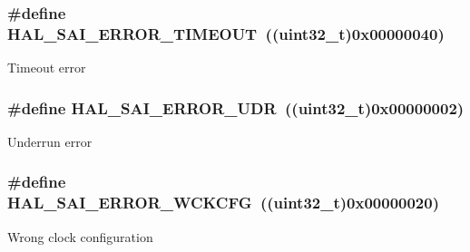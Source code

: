 \subsubsection[{\texorpdfstring{H\+A\+L\+\_\+\+S\+A\+I\+\_\+\+E\+R\+R\+O\+R\+\_\+\+T\+I\+M\+E\+O\+UT}{HAL_SAI_ERROR_TIMEOUT}}]{\setlength{\rightskip}{0pt plus 5cm}\#define H\+A\+L\+\_\+\+S\+A\+I\+\_\+\+E\+R\+R\+O\+R\+\_\+\+T\+I\+M\+E\+O\+UT~((uint32\+\_\+t)0x00000040)}\hypertarget{group___s_a_i___error___code_ga9093326866198c250fc9a40bd21811bc}{}\label{group___s_a_i___error___code_ga9093326866198c250fc9a40bd21811bc}
Timeout error 
\subsubsection[{\texorpdfstring{H\+A\+L\+\_\+\+S\+A\+I\+\_\+\+E\+R\+R\+O\+R\+\_\+\+U\+DR}{HAL_SAI_ERROR_UDR}}]{\setlength{\rightskip}{0pt plus 5cm}\#define H\+A\+L\+\_\+\+S\+A\+I\+\_\+\+E\+R\+R\+O\+R\+\_\+\+U\+DR~((uint32\+\_\+t)0x00000002)}\hypertarget{group___s_a_i___error___code_ga198e1a2760419cfd42d9c7ee04615396}{}\label{group___s_a_i___error___code_ga198e1a2760419cfd42d9c7ee04615396}
Underrun error 
\subsubsection[{\texorpdfstring{H\+A\+L\+\_\+\+S\+A\+I\+\_\+\+E\+R\+R\+O\+R\+\_\+\+W\+C\+K\+C\+FG}{HAL_SAI_ERROR_WCKCFG}}]{\setlength{\rightskip}{0pt plus 5cm}\#define H\+A\+L\+\_\+\+S\+A\+I\+\_\+\+E\+R\+R\+O\+R\+\_\+\+W\+C\+K\+C\+FG~((uint32\+\_\+t)0x00000020)}\hypertarget{group___s_a_i___error___code_gaa2a459f53c9b44c5a32a30740d4e2c09}{}\label{group___s_a_i___error___code_gaa2a459f53c9b44c5a32a30740d4e2c09}
Wrong clock configuration 